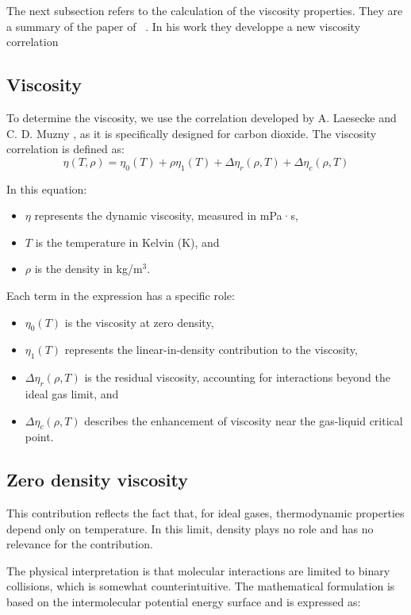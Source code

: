 The next subsection refers to the calculation of the viscosity properties. They
are a summary of the paper of ~\cite{}. In his work they developpe a new
viscosity correlation

\subsection{Viscosity}

To determine the viscosity, we use the correlation developed by A. Laesecke and
C. D. Muzny \cite{laesecke2017reference}, as it is specifically designed for
carbon dioxide. The viscosity correlation is defined as:
\begin{equation}
    \eta(T,\rho) = \eta_0(T) + \rho\eta_1(T) + \Delta\eta_r(\rho,T) + \Delta\eta_c(\rho,T)
\end{equation}

In this equation:
\begin{itemize}
    \item $\eta$ represents the dynamic viscosity, measured in mPa·s,
    \item $T$ is the temperature in Kelvin (K), and
    \item $\rho$ is the density in kg/m$^3$.
\end{itemize}

Each term in the expression has a specific role:
\begin{itemize}
    \item $\eta_0(T)$ is the viscosity at zero density,
    \item $\eta_1(T)$ represents the linear-in-density contribution to the viscosity,
    \item $\Delta \eta_r(\rho, T)$ is the residual viscosity, accounting for interactions beyond the ideal gas limit, and
    \item $\Delta \eta_c(\rho, T)$ describes the enhancement of viscosity near the gas-liquid critical point.
\end{itemize}

\subsection{Zero density viscosity}

This contribution reflects the fact that, for ideal gases, thermodynamic
properties depend only on temperature. In this limit, density plays no role and
has no relevance for the contribution.

The physical interpretation is that molecular interactions are limited to binary
collisions, which is somewhat counterintuitive. The mathematical formulation is
based on the intermolecular potential energy surface and is expressed as:


